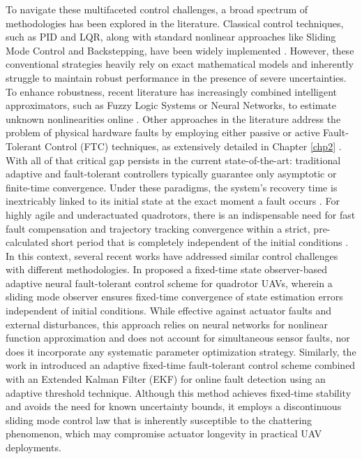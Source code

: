 To navigate these multifaceted control challenges, a broad spectrum of methodologies has been explored in the literature. Classical control techniques, such as PID and LQR, along with standard nonlinear approaches like Sliding Mode Control and Backstepping, have been widely implemented \cite{PID1, lqr1}. However, these conventional strategies heavily rely on exact mathematical models and inherently struggle to maintain robust performance in the presence of severe uncertainties. To enhance robustness, recent literature has increasingly combined intelligent approximators, such as Fuzzy Logic Systems or Neural Networks, to estimate unknown nonlinearities online \cite{fls}. Other approaches in the literature address the problem of physical hardware faults by employing either passive or active Fault-Tolerant Control (FTC) techniques, as extensively detailed in Chapter \ref{chp2} \cite{ftc_UAV_review1}. With all of that critical gap persists in the current state-of-the-art: traditional adaptive and fault-tolerant controllers typically guarantee only asymptotic or finite-time convergence. Under these paradigms, the system's recovery time is inextricably linked to its initial state at the exact moment a fault occurs \cite{Bhat2000}. For highly agile and underactuated quadrotors, there is an indispensable need for fast fault compensation and trajectory tracking convergence within a strict, pre-calculated short period that is completely independent of the initial conditions \cite{fxt, Zuo2018}. In this context, several recent works have addressed similar control challenges with different methodologies. In \cite{ranjan2025} proposed a fixed-time state observer-based adaptive neural fault-tolerant control scheme for quadrotor UAVs, wherein a sliding mode observer ensures fixed-time convergence of state estimation errors independent of initial conditions. While effective against actuator faults and external disturbances, this approach relies on neural networks for nonlinear function approximation and does not account for simultaneous sensor faults, nor does it incorporate any systematic parameter optimization strategy. Similarly, the work in\cite{robust_ftc_2024} introduced an adaptive fixed-time fault-tolerant control scheme combined with an Extended Kalman Filter (EKF) for online fault detection using an adaptive threshold technique. Although this method achieves fixed-time stability and avoids the need for known uncertainty bounds, it employs a discontinuous sliding mode control law that is inherently susceptible to the chattering phenomenon, which may compromise actuator longevity in practical UAV deployments. 

